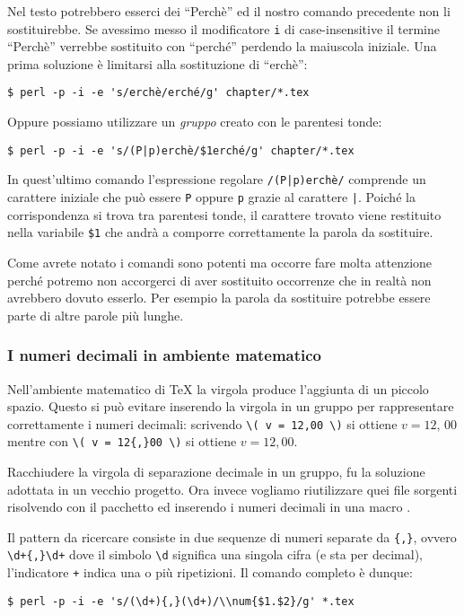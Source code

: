 Nel testo potrebbero esserci dei ``Perchè'' ed il nostro comando precedente non li sostituirebbe. Se avessimo messo il modificatore \texttt{i} di case-insensitive il termine ``Perchè'' verrebbe sostituito con ``perché'' perdendo la maiuscola iniziale.
Una prima soluzione è limitarsi alla sostituzione di ``erchè'':
\begin{verbatim}
$ perl -p -i -e 's/erchè/erché/g' chapter/*.tex
\end{verbatim}

Oppure possiamo utilizzare un \emph{gruppo} creato con le parentesi tonde:
\begin{verbatim}
$ perl -p -i -e 's/(P|p)erchè/$1erché/g' chapter/*.tex
\end{verbatim}

In quest'ultimo comando l'espressione regolare \texttt{/(P|p)erchè/} comprende un carattere iniziale che può essere \texttt{P} oppure \texttt{p} grazie al carattere \texttt{|}. Poiché la corrispondenza si trova tra parentesi tonde, il carattere trovato viene restituito nella variabile \texttt{\$1} che andrà a comporre correttamente la parola da sostituire.

Come avrete notato i comandi sono potenti ma occorre fare molta attenzione perché potremo non accorgerci di aver sostituito occorrenze che in realtà non avrebbero dovuto esserlo. Per esempio la parola da sostituire potrebbe essere parte di altre parole più lunghe.

\subsubsection{I numeri decimali in ambiente matematico}

Nell'ambiente matematico di \TeX{} la virgola produce l'aggiunta di un piccolo spazio. Questo si può evitare inserendo la virgola in un gruppo per rappresentare correttamente i numeri decimali: scrivendo \verb!\( v = 12,00 \)! si ottiene \( v = 12,\, 00 \) mentre con \verb!\( v = 12{,}00 \)! si ottiene \( v = 12,00 \).

Racchiudere la virgola di separazione decimale in un gruppo, fu la soluzione adottata in un vecchio progetto. Ora invece vogliamo riutilizzare quei file sorgenti risolvendo con il pacchetto  ed inserendo i numeri decimali in una macro . 

Il pattern da ricercare consiste in due sequenze di numeri separate da \texttt{\{,\}}, ovvero \verb=\d+{,}\d+= dove il simbolo \verb=\d= significa una singola cifra (e sta per decimal), l'indicatore \texttt{+} indica una o più ripetizioni. Il comando completo è dunque:
\begin{verbatim}
$ perl -p -i -e 's/(\d+){,}(\d+)/\\num{$1.$2}/g' *.tex
\end{verbatim}




